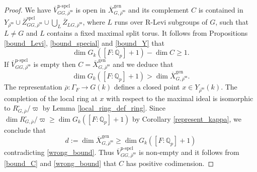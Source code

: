 \documentclass{amsart}
\theoremstyle{definition}
\theoremstyle{remark}
\newcommand{\Qp}{\mathbb {Q}_p}
\newcommand{\Zbar}{\overline{Z}}
\newcommand{\Vbar}{\overline{{V}}}
\newcommand{\rhobar}{\overline{\rho}}
\newcommand{\gen}{\mathrm{gen}}
\newcommand{\Xbar}{\overline{X}}
\DeclareMathOperator{\spcl}{spcl}
\DeclareMathOperator{\nspcl}{n-spcl}
\newcommand{\rhobarss}{\rhobar^{\mathrm{ss}}}
\begin{document}
\begin{proof} We have $\Vbar^{\nspcl}_{GG, \rhobarss}$ is open in $\Xbar^{\gen}_{G, \rhobarss}$ and 
its complement $C$ is contained in $Y_{\rhobarss}\cup \Zbar^{\spcl}_{GG, \rhobarss} \cup \bigcup_L \Zbar_{LG, \rhobarss}$, where $L$ runs over R-Levi subgroups of $G$, such that $L\neq G$ and $L$ contains
a fixed maximal split torus. It follows from Propositions \ref{bound_Levi}, \ref{bound_special}
and \ref{bound_Y} that 
\begin{equation} \label{bound_C}
\dim G_k([F:\Qp]+1) - \dim C \ge 1.
\end{equation}
If $\Vbar^{\nspcl}_{GG, \rhobarss}$ is empty then $C= \Xbar^{\gen}_{G, \rhobarss}$ and we deduce
that 
\begin{equation}\label{wrong_bound}
\dim G_k([F:\Qp]+1) > \dim \Xbar^{\gen}_{G, \rhobarss}.
\end{equation}
The representation $\rhobar: \Gamma_F \rightarrow G(k)$ defines a closed point $x\in Y_{\rhobarss}(k)$. The completion of the local ring at $x$ with respect to the maximal ideal 
is isomorphic to $R^{\square}_{G,\rhobar}/\varpi$ 
by Lemma \ref{local_ring_def_ring}. Since $\dim R^{\square}_{G,\rhobar}/\varpi \ge \dim G_k([F:\Qp]+1)$ by 
Corollary \ref{represent_kappa}, we conclude that 
\begin{equation}\label{bound_d}
d:=\dim \Xbar^{\gen}_{G, \rhobarss}\ge  \dim G_k([F:\Qp]+1)
\end{equation}
contradicting \eqref{wrong_bound}. Thus $\Vbar^{\nspcl}_{GG, \rhobarss}$ is non-empty
and it follows from \eqref{bound_C} and \eqref{wrong_bound} that $C$ has positive codimension.


\end{proof}
\end{document}
